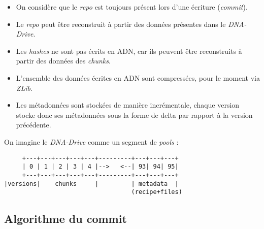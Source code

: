 \documentclass[a4paper]{article}
\begin{document}
\begin{itemize}
\item
  On considère que le \emph{repo} est toujours présent lors d'une
  écriture (\emph{commit}).
\item
  Le \emph{repo} peut être reconstruit à partir des données présentes
  dans le \emph{DNA-Drive}.
\item
  Les \emph{hashes} ne sont pas écrits en ADN, car ils peuvent être
  reconstruits à partir des données des \emph{chunks}.
\item
  L'ensemble des données écrites en ADN sont compressées, pour le moment
  via \emph{ZLib}.
\item
  Les métadonnées sont stockées de manière incrémentale, chaque version
  stocke donc ses métadonnées sous la forme de delta par rapport à la
  version précédente.
\end{itemize}

On imagine le \emph{DNA-Drive} comme un segment de \emph{pools} :

\begin{verbatim}
     +---+---+---+---+---+---------+---+---+---+
     | 0 | 1 | 2 | 3 | 4 |-->   <--| 93| 94| 95|
     +---+---+---+---+---+---------+---+---+---+
|versions|    chunks     |         | metadata  |
                                   (recipe+files)
\end{verbatim}

\subsection{Algorithme du commit}
\end{document}
